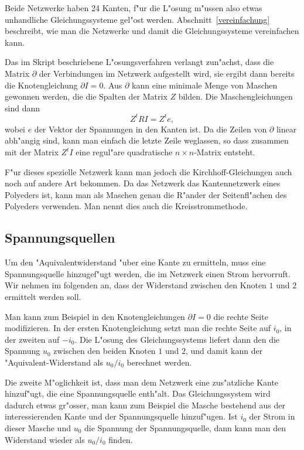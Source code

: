 \documentclass[a4paper,12pt]{article}
\begin{document}
Beide Netzwerke haben 24 Kanten, f"ur die L"osung m"ussen also etwas
unhandliche Gleichungssysteme gel"ost werden.
Abschnitt~\ref{vereinfachung} beschreibt, wie man die Netzwerke und
damit die Gleichungssysteme vereinfachen kann.

Das im Skript beschriebene L"osungsverfahren verlangt zun"achst,
dass die Matrix $\partial$ der Verbindungen im Netzwerk aufgestellt
wird, sie ergibt dann bereits die Knotengleichung $\partial I=0$.
Aus $\partial$ kann eine minimale Menge von Maschen gewonnen werden,
die die Spalten der Matrix $Z$ bilden.
Die Maschengleichungen sind dann
\begin{equation}
Z^tRI=Z^te,
\label{maschengleichung}
\end{equation}
wobei $e$ der Vektor der Spannungen in den Kanten ist.
Da die Zeilen von $\partial$ linear abh"angig sind, kann man
einfach die letzte Zeile weglassen, so dass zusammen mit der Matrix $Z^tI$
eine regul"are quadratische $n\times n$-Matrix entsteht.

F"ur dieses spezielle Netzwerk kann man jedoch die Kirchhoff-Gleichungen
auch noch auf andere Art bekommen.
Da das Netzwerk das Kantennetzwerk eines Polyeders ist, kann man als
Maschen genau die R"ander der Seitenfl"achen des Polyeders verwenden.
Man nennt dies auch die Kreisstrommethode.

\subsection{Spannungsquellen\label{quelle}}
Um den "Aquivalentwiderstand "uber eine Kante zu ermitteln, muss
eine Spannungsquelle hinzugef"ugt werden, die im Netzwerk einen
Strom hervorruft.
Wir nehmen im folgenden an, dass der Widerstand zwischen den Knoten
$1$ und $2$ ermittelt werden soll.

Man kann zum Beispiel in den Knotengleichungen $\partial I=0$
die rechte Seite modifizieren.
In der ersten Knotengleichung setzt man die rechte Seite auf $i_0$,
in der zweiten auf $-i_0$.
Die L"osung des Gleichungssystems liefert dann den die Spannung $u_0$ zwischen
den beiden Knoten $1$ und $2$, und damit kann der "Aquivalent-Widerstand
als $u_0/i_0$ berechnet werden.

Die zweite M"oglichkeit ist, dass man dem Netzwerk eine zus"atzliche
Kante hinzuf"ugt, die eine Spannungsquelle enth"alt. 
Das Gleichungssystem wird dadurch etwas gr"osser, man kann zum
Beispiel die Masche bestehend aus der interessierenden Kante und
der Spannungsquelle hinzuf"ugen.
Ist $i_0$ der Strom in dieser Masche und $u_0$ die Spannung der
Spannungsquelle, dann kann man den Widerstand wieder als $u_0/i_0$
finden.
\end{document}
